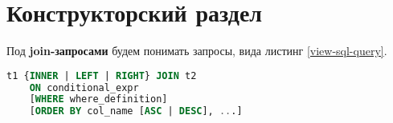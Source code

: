 \chapter{Конструкторский раздел}

Под \textbf{join-запросами} будем понимать запросы, вида листинг \ref{view-sql-query}.

\begin{lstlisting}[language=sql, caption={Вид sql запроса},label=view-sql-query]
t1 {INNER | LEFT | RIGHT} JOIN t2
    ON conditional_expr
    [WHERE where_definition]
    [ORDER BY col_name [ASC | DESC], ...]
\end{lstlisting}


